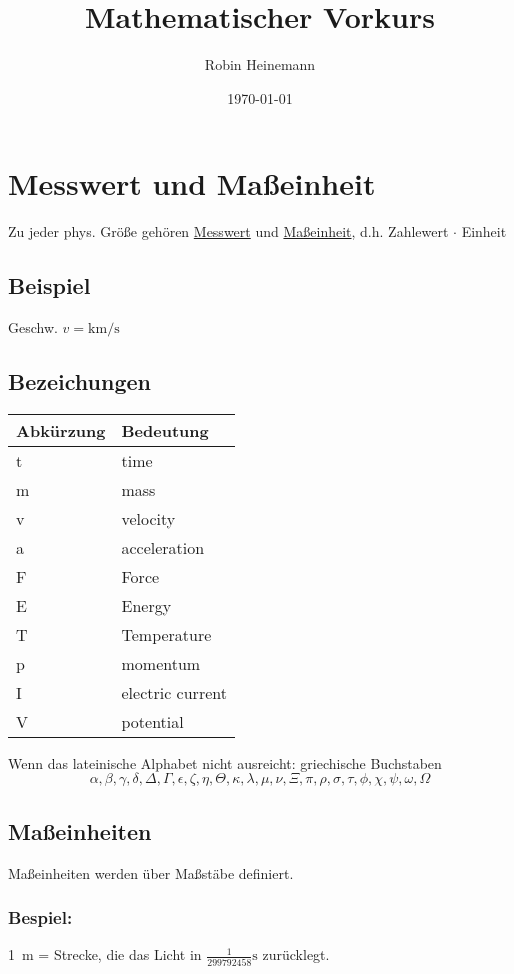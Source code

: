\documentclass[a4paper]{scrartcl}
\author{Robin Heinemann}
\date{\today}
\title{Mathematischer Vorkurs}
\begin{document}
\maketitle
\tableofcontents


\section{Messwert und Maßeinheit}
\label{sec-1}
Zu jeder phys. Größe gehören \uline{Messwert} und \uline{Maßeinheit}, d.h. Zahlewert $\cdot$ Einheit

\subsection{Beispiel}
\label{sec-1-1}
Geschw. $v = \si{\kilo\meter\per\second}$

\subsection{Bezeichungen}
\label{sec-1-2}
\begin{center}
\begin{tabular}{ll}
Abkürzung & Bedeutung\\
\hline
t & time\\
m & mass\\
v & velocity\\
a & acceleration\\
F & Force\\
E & Energy\\
T & Temperature\\
p & momentum\\
I & electric current\\
V & potential\\
\end{tabular}
\end{center}

Wenn das lateinische  Alphabet nicht ausreicht: griechische Buchstaben
\[\alpha, \beta, \gamma, \delta, \Delta, \Gamma, \epsilon, \zeta, \eta, \Theta, \kappa, \lambda, \mu, \nu, \Xi, \pi, \rho, \sigma, \tau, \phi, \chi, \psi, \omega, \Omega\]

\subsection{Maßeinheiten}
\label{sec-1-3}
Maßeinheiten werden über Maßstäbe definiert.

\subsubsection{Bespiel:}
\label{sec-1-3-1}
\SI{1}{\meter} = Strecke, die das Licht in $\frac{1}{299792458}\si{\second}$ zurücklegt.
\end{document}
